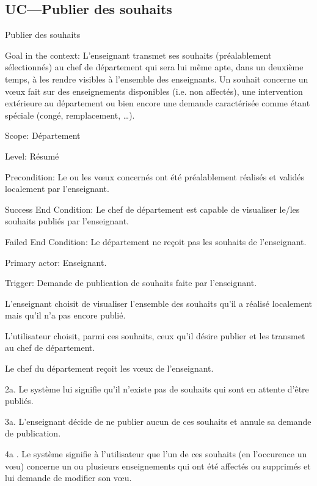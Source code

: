 \subsection{UC---Publier des souhaits}
\begin{usecase}{Publier des souhaits}
\label{usecase:publier}
\begin{information}
	\item[Goal in the context:] L'enseignant transmet ses souhaits (préalablement sélectionnés) au chef de département qui sera lui même apte, dans un deuxième temps, à les rendre visibles à l'ensemble des enseignants.
Un souhait concerne un vœux fait sur des enseignements disponibles (i.e. non affectés), une intervention extérieure au département ou bien encore une demande caractérisée comme étant spéciale (congé, remplacement, \dots). 
	\item[Scope:] Département
	\item[Level:] Résumé
	\item[Precondition:] Le ou les vœux concernés ont été préalablement réalisés et validés localement par l'enseignant.
	\item[Success End Condition:] Le chef de département est capable de visualiser le/les souhaits publiés par l'enseignant.
	\item[Failed End Condition:] Le département ne reçoit pas les souhaits de l'enseignant.
	\item[Primary actor:] Enseignant.
	\item[Trigger:] Demande de publication de souhaits faite par l'enseignant.
\end{information}
\end{usecase}


\begin{scenario}
	\item L'enseignant choisit de visualiser l'ensemble des souhaits qu'il a réalisé localement mais qu'il n'a pas encore publié.
	\item L'utilisateur choisit, parmi ces souhaits, ceux qu'il désire publier et les transmet au chef de département.
	\item Le chef du département reçoit les vœux de l'enseignant.
\end{scenario}

 \begin{extension}
	 \item [2a.] Le système lui signifie qu'il n'existe pas de souhaits qui sont en attente d'être publiés.
	 \item [3a.] L'enseignant décide de ne publier aucun de ces souhaits et annule sa demande de publication.
	 \item [4a]. Le système signifie à l'utilisateur que l'un de ces souhaits (en l'occurence un vœu) concerne un ou plusieurs enseignements qui ont été affectés ou supprimés et lui demande de modifier son vœu.\\
 \end{extension}


